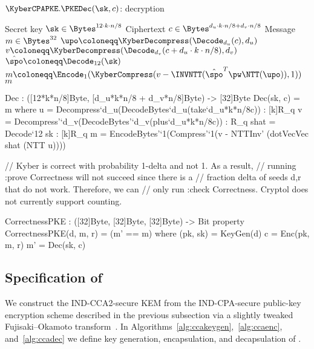 \begin{algorithm}
  \caption{$\KyberCPAPKE.\PKEDec(\sk,c)$: decryption\label{kybercpa-dec}}
  \begin{algorithmic}[1]
    \Require Secret key $\sk \in \Bytes^{12\cdot k\cdot n/8}$
    \Require Ciphertext $c \in \Bytes^{d_u\cdot k\cdot n/8 + d_v\cdot n/8}$
    \Ensure Message $m \in \Bytes^{32}$
    \State $\upo \coloneqq \KyberDecompress(\Decode_{d_u}(c),d_u)$
    \State $v \coloneqq \KyberDecompress(\Decode_{d_v}(c+d_u\cdot k\cdot n/8),d_v)$
    \State $\hat{\spo} \coloneqq \Decode_{12}(\sk)$
    \State $m \coloneqq \Encode_1(\KyberCompress(v-\INVNTT(\hat{\spo}^T\pw\NTT(\upo)),1))$ \label{line:decrypt} 
    \State \Return $m$
\end{algorithmic}
\end{algorithm}

\begin{code}
  Dec : ([12*k*n/8]Byte, [d_u*k*n/8 + d_v*n/8]Byte) -> [32]Byte
  Dec(sk, c) = m where
    u = Decompress`{d_u}(DecodeBytes`{d_u}(take`{d_u*k*n/8}c))   : [k]R_q
    v = Decompress'`{d_v}(DecodeBytes'`{d_v}(plus`{d_u*k*n/8}c)) : R_q
    shat = Decode`{12} sk : [k]R_q
    m = EncodeBytes'`{1}(Compress'`{1}(v - NTTInv' (dotVecVec shat (NTT u))))

  // Kyber is correct with probability 1-delta and not 1. As a result,
  // running :prove Correctness will not succeed since there is a 
  // fraction delta of seeds d,r that do not work. Therefore, we can 
  // only run :check Correctness. Cryptol does not currently support counting.

  CorrectnessPKE : ([32]Byte, [32]Byte, [32]Byte) -> Bit
  property CorrectnessPKE(d, m, r) = (m' == m) where
    (pk, sk) = KeyGen(d)
    c = Enc(pk, m, r)
    m' = Dec(sk, c)
\end{code}

\clearpage

\subsection{Specification of \KyberCCAKEM}
\label{subsec:specification:ccakem}

We construct the \KyberCCAKEM IND-CCA2-secure KEM from the IND-CPA-secure
public-key encryption scheme described in the previous subsection via a slightly
tweaked Fujisaki--Okamoto transform~\cite{C:FujOka99}. 
In Algorithms~\ref{alg:ccakeygen},~\ref{alg:ccaenc}, and~\ref{alg:ccadec}
we define key generation, encapsulation, and decapsulation of \KyberCCAKEM.

